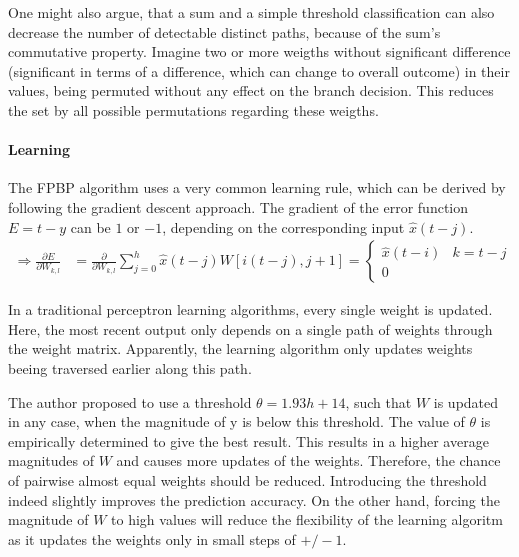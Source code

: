 \documentclass{article}
\begin{document}
One might also argue, that a sum and a simple threshold classification can also decrease the number of detectable distinct paths, because of the sum's commutative property. Imagine two or more weigths without significant  difference (significant in terms of a difference, which can change to overall outcome) in their values, being permuted without any effect on the branch decision. This reduces the set by all possible permutations regarding these weigths.

\paragraph{Learning}
The FPBP algorithm uses a very common learning rule, which can be derived by following the gradient descent approach. The gradient of the error function $E=t-y$ can be $1$ or $-1$, depending on the corresponding input $\hat{x}(t-j)$.
\begin{align*} 
	\Rightarrow \frac{\partial E}{\partial W_{k,l}} &= \frac{\partial}{\partial W_{k,l}} \sum_{j=0}^{h} \hat{x}(t-j) W[i(t-j),j+1] = \begin{cases} \hat{x}(t-i) & k=t-j \\ 0 & \end{cases} 
\end{align*}

In a traditional perceptron learning algorithms, every single weight is updated. Here, the most recent output only depends on a single path of weights through the weight matrix. Apparently, the learning algorithm only updates weights beeing traversed earlier along this path.



The author proposed to use a threshold $\theta = 1.93 h + 14$, such that $W$ is updated in any case, when the magnitude of y is below this threshold. The value of $\theta$ is empirically determined to give the best result. This results in a higher average magnitudes of $W$  and causes more updates of the weights. Therefore, the chance of pairwise almost equal weights should be reduced. Introducing the threshold indeed slightly improves the prediction accuracy.
On the other hand, forcing the magnitude of $W$ to high values will reduce the flexibility of the learning algoritm as it updates the weights only in small steps of $+/-1$.
\end{document}
